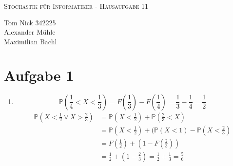 \documentclass[10pt,a4paper,parskip=half]{scrartcl}
\newcommand{\PP}{\mathbb{P}}
\begin{document}
\begin{center}
\textsc{\Large{Stochastik für Informatiker - Hausaufgabe 11}} \\
\end{center}
\begin{tabbing}
Tom Nick \hspace{1.4cm}\= 342225\\
Alexander Mühle\\
Maximilian Bachl
\end{tabbing}

\section*{Aufgabe 1}
\begin{enumerate}
\item
$$\PP(\frac14 < X < \frac13) = F(\frac13) - F(\frac14) = \frac13 - \frac14 = \frac12$$
\begin{align*}
\PP(X < \frac12 \lor X > \frac23) &= \PP(X < \frac12) + \PP(\frac23 < X) \\
&= \PP(X < \frac12) + (\PP(X < 1) - \PP(X < \frac23) \\
&= F(\frac12) + (1 - F(\frac23)) \\
&= \frac12 + (1 - \frac23) = \frac12 + \frac13 = \frac56
\end{align*}

\end{enumerate}
\end{document}
